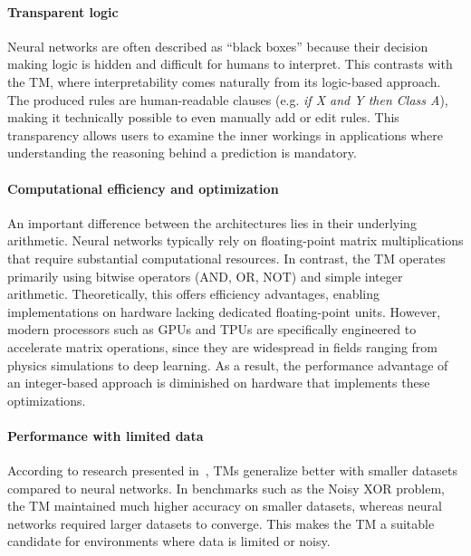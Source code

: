 \paragraph{Transparent logic}
Neural networks are often described as ``black boxes'' because their decision making logic is hidden and difficult for humans to interpret. This contrasts with the TM, where interpretability comes naturally from its logic-based approach. The produced rules are human-readable clauses (e.g. \textit{if X and Y then Class A}), making it technically possible to even manually add or edit rules. This transparency allows users to examine the inner workings in applications where understanding the reasoning behind a prediction is mandatory.

\paragraph{Computational efficiency and optimization}
An important difference between the architectures lies in their underlying arithmetic. Neural networks typically rely on floating-point matrix multiplications that require substantial computational resources. In contrast, the TM operates primarily using bitwise operators (AND, OR, NOT) and simple integer arithmetic. Theoretically, this offers efficiency advantages, enabling implementations on hardware lacking dedicated floating-point units. However, modern processors such as GPUs and TPUs are specifically engineered to accelerate matrix operations, since they are widespread in fields ranging from physics simulations to deep learning. As a result, the performance advantage of an integer-based approach is diminished on hardware that implements these optimizations.

\paragraph{Performance with limited data}
According to research presented in~\cite{granmo2021tsetlinmachinegame}, TMs generalize better with smaller datasets compared to neural networks. In benchmarks such as the Noisy XOR problem, the TM maintained much higher accuracy on smaller datasets, whereas neural networks required larger datasets to converge. This makes the TM a suitable candidate for environments where data is limited or noisy.

